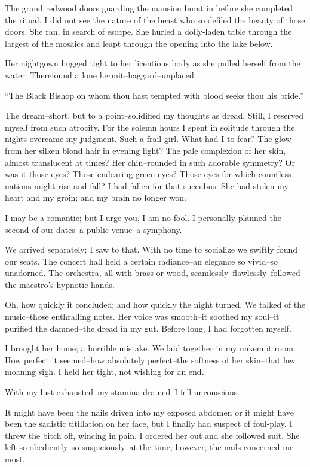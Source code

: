 \documentclass{article}
\begin{document}
\noindent %
The grand redwood doors guarding the mansion burst in
before she completed the ritual.
I did not see the nature of the beast who so defiled the
beauty of those doors.
She ran, in search of escape.
She hurled a doily-laden table through the largest
of the mosaics and leapt through the opening
into the lake below.


Her nightgown hugged tight to her licentious body
as she pulled herself from the water.
Therefound a lone hermit--haggard--unplaced.


``The Black Bishop on whom thou hast tempted
with blood seeks thou his bride.''
\vvvv


\noindent
The dream--short, but to a point--solidified my thoughts as dread.
Still, I reserved myself from such atrocity.
For the solemn hours I spent in solitude through the nights
overcame my judgment.
Such a frail girl.
What had I to fear?
The glow from her silken blond hair in evening light?
The pale complexion of her skin, almost translucent at times?
Her chin--rounded in such adorable symmetry?
Or was it those eyes? Those endearing green eyes?
Those eyes for which countless nations might rise and fall?
I had fallen for that succubus.
She had stolen my heart and my groin;
and my brain no longer won.
\VV


\noindent
I may be a romantic; but I urge you, I am no fool.
I personally planned the second of our dates--a public venue--a symphony.


We arrived separately; I saw to that.
With no time to socialize we swiftly found our seats.
The concert hall held a certain radiance--an elegance
so vivid--so unadorned.
The orchestra, all with brass or wood, seamlessly--flawlessly--followed
the maestro's hypnotic hands.


Oh, how quickly it concluded; and how quickly the night turned.
We talked of the music--those enthralling notes.
Her voice was smooth--it soothed my soul--it purified
the damned--the dread in my gut.
Before long, I had forgotten myself.


I brought her home; a horrible mistake.
We laid together in my unkempt room.
How perfect it seemed--how
absolutely perfect--the
softness of her skin--that
low moaning sigh.
I held her tight, not wishing for an end.
\VV


\noindent
With my lust exhausted--my stamina drained--I fell unconscious.
\VV


\noindent
It might have been the nails driven into my exposed abdomen
or it might have been the sadistic titillation on her face,
but I finally had suspect of foul-play.
I threw the bitch off, wincing in pain.
I ordered her out and she followed suit.
She left so obediently--so suspiciously--at
the time, however, the nails concerned me most.
\end{document}
